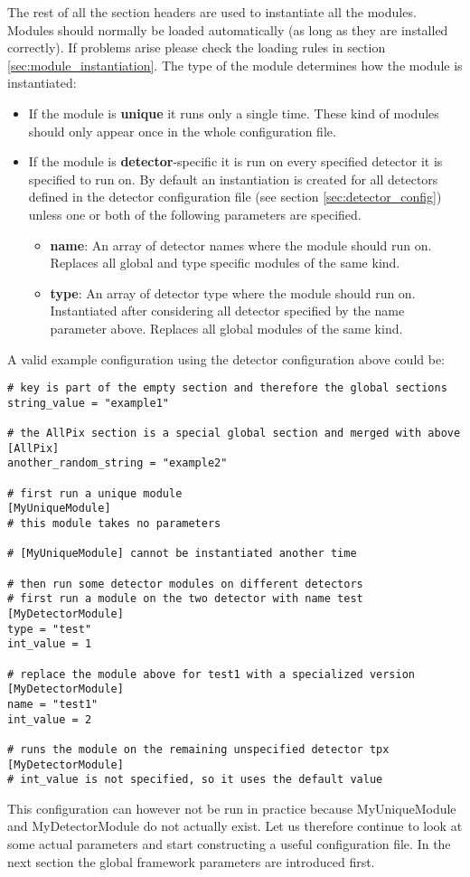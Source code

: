 The rest of all the section headers are used to instantiate all the modules. Modules should normally be loaded automatically (as long as they are installed correctly). If problems arise please check the loading rules in section \ref{sec:module_instantiation}. The type of the module determines how the module is instantiated:
\begin{itemize}
\item If the module is \textbf{unique} it runs only a single time. These kind of modules should only appear once in the whole configuration file.
\item If the module is \textbf{detector}-specific it is run on every specified detector it is specified to run on. By default an instantiation is created for all detectors defined in the detector configuration file (see section \ref{sec:detector_config}) unless one or both of the following parameters are specified.
\begin{itemize}
\item \textbf{name}: An array of detector names where the module should run on. Replaces all global and type specific modules of the same kind.
\item \textbf{type}: An array of detector type where the module should run on. Instantiated after considering all detector specified by the name parameter above. Replaces all global modules of the same kind. 
\end{itemize}
\end{itemize}

A valid example configuration using the detector configuration above could be:
\begin{verbatim}
# key is part of the empty section and therefore the global sections
string_value = "example1"

# the AllPix section is a special global section and merged with above
[AllPix]
another_random_string = "example2"

# first run a unique module
[MyUniqueModule]
# this module takes no parameters

# [MyUniqueModule] cannot be instantiated another time

# then run some detector modules on different detectors 
# first run a module on the two detector with name test
[MyDetectorModule]
type = "test"
int_value = 1

# replace the module above for test1 with a specialized version 
[MyDetectorModule]
name = "test1"
int_value = 2

# runs the module on the remaining unspecified detector tpx
[MyDetectorModule]
# int_value is not specified, so it uses the default value
\end{verbatim}
This configuration can however not be run in practice because MyUniqueModule and MyDetectorModule do not actually exist. Let us therefore continue to look at some actual parameters and start constructing a useful configuration file. In the next section the global framework parameters are introduced first.

